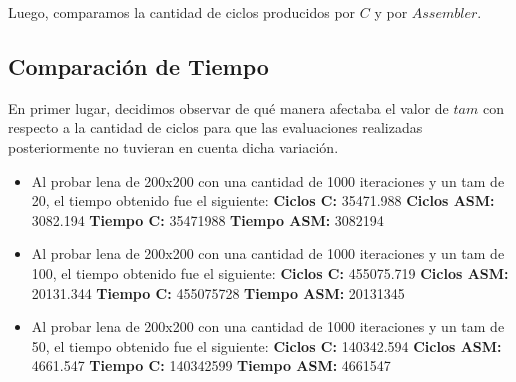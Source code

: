\documentclass[10pt, a4paper]{article}
\begin{document}
\begin{itemize}
Luego, comparamos la cantidad de ciclos producidos por $C$ y por $Assembler$.\newline

\subsection{Comparación de Tiempo}

En primer lugar, decidimos observar de qué manera afectaba el valor de $tam$ con respecto a la cantidad de ciclos para que las evaluaciones realizadas posteriormente no tuvieran en cuenta dicha variación.\newline

\begin{itemize}
\item{Al probar lena de 200x200 con una cantidad de 1000 iteraciones y un tam de 20, el tiempo obtenido fue el siguiente:\newline
\newline
\textbf{Ciclos C:}                 35471.988\newline
\vspace{0.15cm}
\textbf{Ciclos ASM:}               3082.194\newline
\textbf{Tiempo C:}                 35471988\newline
\textbf{Tiempo ASM:}               3082194\newline}


\item{Al probar lena de 200x200 con una cantidad de 1000 iteraciones y un tam de 100, el tiempo obtenido fue el siguiente:\newline
\newline
\textbf{Ciclos C:}                 455075.719\newline
\vspace{0.15cm}
\textbf{Ciclos ASM:}               20131.344\newline
\textbf{Tiempo C:}                 455075728\newline
\textbf{Tiempo ASM:}               20131345\newline}


\item{Al probar lena de 200x200 con una cantidad de 1000 iteraciones y un tam de 50, el tiempo obtenido fue el siguiente:\newline
\newline
\textbf{Ciclos C:}                 140342.594\newline
\vspace{0.15cm}
\textbf{Ciclos ASM:}               4661.547\newline
\textbf{Tiempo C:}                 140342599\newline
\textbf{Tiempo ASM:}               4661547\newline}


\end{itemize}
\end{itemize}
\end{document}

